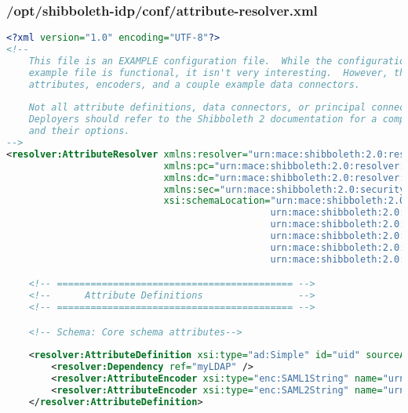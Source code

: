 \subsubsection{/opt/shibboleth-idp/conf/attribute-resolver.xml}
\begin{lstlisting}[language=xml]
<?xml version="1.0" encoding="UTF-8"?>
<!-- 
    This file is an EXAMPLE configuration file.  While the configuration presented in this 
    example file is functional, it isn't very interesting.  However, there are lots of example
    attributes, encoders, and a couple example data connectors.
    
    Not all attribute definitions, data connectors, or principal connectors are demonstrated.
    Deployers should refer to the Shibboleth 2 documentation for a complete list of components 
    and their options.
-->
<resolver:AttributeResolver xmlns:resolver="urn:mace:shibboleth:2.0:resolver" xmlns:xsi="http://www.w3.org/2001/XMLSchema-instance" 
                            xmlns:pc="urn:mace:shibboleth:2.0:resolver:pc" xmlns:ad="urn:mace:shibboleth:2.0:resolver:ad" 
                            xmlns:dc="urn:mace:shibboleth:2.0:resolver:dc" xmlns:enc="urn:mace:shibboleth:2.0:attribute:encoder" 
                            xmlns:sec="urn:mace:shibboleth:2.0:security" 
                            xsi:schemaLocation="urn:mace:shibboleth:2.0:resolver classpath:/schema/shibboleth-2.0-attribute-resolver.xsd
                                               urn:mace:shibboleth:2.0:resolver:pc classpath:/schema/shibboleth-2.0-attribute-resolver-pc.xsd
                                               urn:mace:shibboleth:2.0:resolver:ad classpath:/schema/shibboleth-2.0-attribute-resolver-ad.xsd
                                               urn:mace:shibboleth:2.0:resolver:dc classpath:/schema/shibboleth-2.0-attribute-resolver-dc.xsd
                                               urn:mace:shibboleth:2.0:attribute:encoder classpath:/schema/shibboleth-2.0-attribute-encoder.xsd
                                               urn:mace:shibboleth:2.0:security classpath:/schema/shibboleth-2.0-security.xsd">

    <!-- ========================================== -->
    <!--      Attribute Definitions                 -->
    <!-- ========================================== -->

    <!-- Schema: Core schema attributes-->
    
    <resolver:AttributeDefinition xsi:type="ad:Simple" id="uid" sourceAttributeID="uid">
        <resolver:Dependency ref="myLDAP" />
        <resolver:AttributeEncoder xsi:type="enc:SAML1String" name="urn:mace:dir:attribute-def:uid" />
        <resolver:AttributeEncoder xsi:type="enc:SAML2String" name="urn:oid:0.9.2342.19200300.100.1.1" friendlyName="uid" />
    </resolver:AttributeDefinition>


\end{lstlisting}
